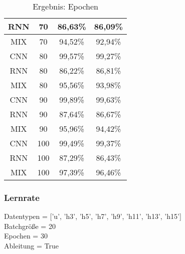 \begin{table}[H]
\begin{tabular}{|c|c|c|c|}
                \hline
                RNN & 70 &  86,63\% & 86,09\%  \\ 
                \hline
                MIX & 70 &  94,52\% & 92,94\%  \\ 
                \hline
                \hline
                CNN & 80 &  99,57\% & 99,27\%  \\ 
                \hline
                RNN & 80 &  86,22\% & 86,81\%  \\ 
                \hline
                MIX & 80 &  95,56\% & 93,98\%  \\ 
                \hline
                \hline
                CNN & 90 &  99,89\% & 99,63\%  \\ 
                \hline
                RNN & 90 &  87,64\% & 86,67\%  \\ 
                \hline
                MIX & 90 &  95,96\% & 94,42\%  \\ 
                \hline
                \hline
                CNN & 100 & 99,49\% & 99,37\%  \\ 
                \hline
                RNN & 100 & 87,29\% & 86,43\%  \\ 
                \hline
                MIX & 100 & 97,39\% & 96,46\% \\
                \hline

            \end{tabular}
            \caption{Ergebnis: Epochen}
            \label{tabl:ErgebnisEpoch}
        \end{table}

    \subsubsection{Lernrate}

        Datentypen = ['u', 'h3', 'h5', 'h7', 'h9', 'h11', 'h13', 'h15']\\
        \noindent
        Batchgröße = 20\\
        \noindent
        Epochen = 30\\
        \noindent
        Ableitung = True\\


